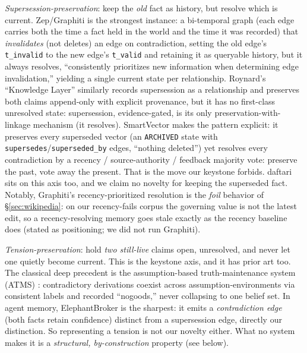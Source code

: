 \documentclass[11pt]{article}
\begin{document}
\emph{Supersession-preservation}: keep the \emph{old} fact as history, but resolve which is current.
Zep/Graphiti \citep{rasmussen2025zep} is the strongest instance: a bi-temporal graph (each edge carries
both the time a fact held in the world and the time it was recorded) that \emph{invalidates}
(not deletes) an edge on contradiction, setting the old edge's \texttt{t\_invalid} to the new edge's
\texttt{t\_valid} and retaining it as queryable history, but it always resolves, ``consistently
prioritizes new information when determining edge invalidation,'' yielding a single current
state per relationship. Roynard's ``Knowledge Layer'' \citep{roynard2026knowledgelayer} similarly records
supersession as a relationship and preserves both claims append-only with explicit
provenance, but it has no first-class unresolved state: supersession, evidence-gated, is its
only preservation-with-linkage mechanism (it resolves). SmartVector \citep{xu2026smartvector} makes the pattern explicit: it
preserves every superseded vector (an \texttt{ARCHIVED} state with \texttt{supersedes}/\texttt{superseded\_by}
edges, ``nothing deleted'') yet resolves every contradiction by a recency / source-authority /
feedback majority vote: preserve the past, vote away the present. That is the move our
keystone forbids. daftari sits on this axis too, and we claim no novelty for keeping the
superseded fact. Notably, Graphiti's recency-prioritized resolution is the
\emph{foil} behavior of \S\ref{sec:wikipedia}: on our recency-fails corpus the governing value is not the latest edit, so
a recency-resolving memory goes stale exactly as the recency baseline does (stated as
positioning; we did not run Graphiti).

\emph{Tension-preservation}: hold \emph{two still-live} claims open, unresolved, and never let one
quietly become current. This is the keystone axis, and it has prior art too. The classical
deep precedent is the assumption-based truth-maintenance system (ATMS) \citep{dekleer1986atms}:
contradictory derivations coexist across assumption-environments via consistent labels and
recorded ``nogoods,'' never collapsing to one belief set. In agent memory, ElephantBroker
\citep{lupascu2026elephantbroker} is the sharpest: it emits a \emph{contradiction edge} (both facts retain confidence)
distinct from a supersession edge, directly our distinction. So representing a tension is
not our novelty either. What no system makes it is a \emph{structural, by-construction}
property (see below).
\end{document}

